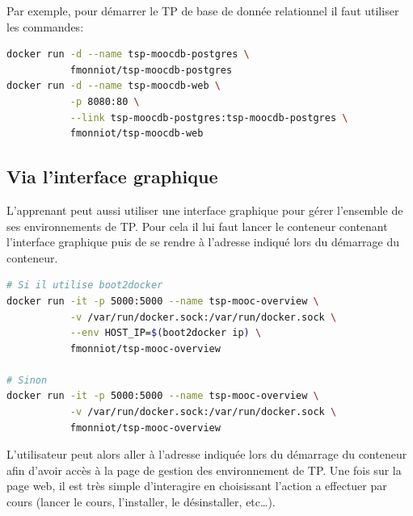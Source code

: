 \documentclass[a4paper,11pt]{report}
\begin{document}
Par exemple, pour démarrer le TP de base de donnée relationnel il faut utiliser les commandes:

\begin{lstlisting}[language=Bash,caption={Démarrer les conteneurs du MOOC de base de donnée}]
docker run -d --name tsp-moocdb-postgres \
           fmonniot/tsp-moocdb-postgres
docker run -d --name tsp-moocdb-web \
           -p 8080:80 \
           --link tsp-moocdb-postgres:tsp-moocdb-postgres \
           fmonniot/tsp-moocdb-web
\end{lstlisting}


\subsection{Via l'interface graphique}

L'apprenant peut aussi utiliser une interface graphique pour gérer l'ensemble de ses environnements de TP. Pour cela il lui faut lancer le conteneur contenant l'interface graphique puis de se rendre à l'adresse indiqué lors du démarrage du conteneur.

\begin{lstlisting}[language=Bash,caption={Démarrer le conteneur Overview}]
# Si il utilise boot2docker
docker run -it -p 5000:5000 --name tsp-mooc-overview \
           -v /var/run/docker.sock:/var/run/docker.sock \
           --env HOST_IP=$(boot2docker ip) \
           fmonniot/tsp-mooc-overview

# Sinon
docker run -it -p 5000:5000 --name tsp-mooc-overview \
           -v /var/run/docker.sock:/var/run/docker.sock \
           fmonniot/tsp-mooc-overview
\end{lstlisting}

L'utilisateur peut alors aller à l'adresse indiquée lors du démarrage du conteneur afin d'avoir accès à la page de gestion des environnement de TP.
Une fois sur la page web, il est très simple d'interagire en choisissant l'action a effectuer par cours (lancer le cours, l'installer, le désinstaller, etc…).

\printbibliography
\lstlistoflistings
\listoffigures
\end{document}
